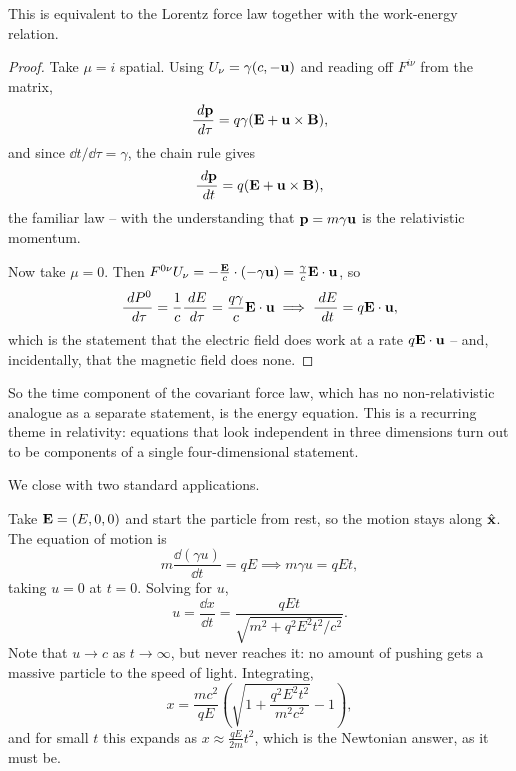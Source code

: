 \documentclass[a4paper]{scrartcl}
\newcommand{\hh}[1]{\hat{\vv{#1}}}
\begin{document}
\begin{proposition}
	This is equivalent to the Lorentz force law together with the work-energy relation.
\end{proposition}
\begin{proof}
	Take $\mu = i$ spatial. Using $U_\nu = \gamma(c, -\mathbf{u})$ and reading off $F^{i\nu}$ from the matrix,
	$$
	\frac{\; d \mathbf{p}}{\; d \tau} = q\gamma(\mathbf{E} + \mathbf{u}\times\mathbf{B}),
	$$
	and since $\dd t/\dd\tau = \gamma$, the chain rule gives
	$$
	\frac{\; d \mathbf{p}}{\; d t} = q(\mathbf{E}+\mathbf{u}\times\mathbf{B}),
	$$
	the familiar law -- with the understanding that $\mathbf{p} = m\gamma\mathbf{u}$ is the relativistic momentum.

	Now take $\mu = 0$. Then $F^{0\nu}U_\nu = -\frac{\mathbf{E}}{c}\cdot(-\gamma\mathbf{u}) = \frac{\gamma}{c}\mathbf{E}\cdot\mathbf{u}$, so
	$$
	\frac{\; d P^0}{\; d\tau} = \frac{1}{c}\frac{\; d E}{\; d \tau} = \frac{q\gamma}{c}\mathbf{E}\cdot\mathbf{u} \implies \frac{\; d E}{\; d t} = q\mathbf{E}\cdot\mathbf{u},
	$$
	which is the statement that the electric field does work at a rate $q\mathbf{E}\cdot\mathbf{u}$ -- and, incidentally, that the magnetic field does none.
\end{proof}

So the time component of the covariant force law, which has no non-relativistic analogue as a separate statement, is the energy equation. This is a recurring theme in relativity: equations that look independent in three dimensions turn out to be components of a single four-dimensional statement.

We close with two standard applications.

\begin{example}
	Take $\mathbf{E} = (E,0,0)$ and start the particle from rest, so the motion stays along $\hh{x}$. The equation of motion is
	$$
	m\frac{\dd(\gamma u)}{\dd t} = qE \implies m\gamma u = qEt,
	$$
	taking $u = 0$ at $t=0$. Solving for $u$,
	$$
	u = \frac{\dd x}{\dd t} = \frac{qEt}{\sqrt{m^2 + q^2E^2t^2/c^2}}.
	$$
	Note that $u \to c$ as $t \to \infty$, but never reaches it: no amount of pushing gets a massive particle to the speed of light. Integrating,
	$$
	x = \frac{mc^2}{qE}\left(\sqrt{1 + \frac{q^2E^2t^2}{m^2c^2}} - 1\right),
	$$
	and for small $t$ this expands as $x \approx \frac{qE}{2m}t^2$, which is the Newtonian answer, as it must be.
\end{example}
\end{document}
